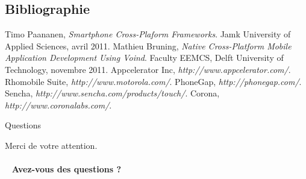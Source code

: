 \documentclass{beamer}
\begin{document}
\subsection{Bibliographie}
\begin{frame}
\begin{thebibliography}{9}
          Timo Paananen,
          \emph{Smartphone Cross-Plaform Frameworks}.
          Jamk University of Applied Sciences,
          avril 2011.
          Mathieu Bruning,
          \emph{Native Cross-Platform Mobile Application Development Using Voind}.
          Faculty EEMCS, Delft University of Technology,
          novembre 2011.
          Appcelerator Inc,
          \emph{http://www.appcelerator.com/}.
          Rhomobile Suite,
          \emph{http://www.motorola.com/}.
          PhoneGap,
          \emph{http://phonegap.com/}.
          Sencha,
          \emph{http://www.sencha.com/products/touch/}.
          Corona,
          \emph{http://www.coronalabs.com/}.
\end{thebibliography}
\end{frame}

\begin{frame}{Questions}
\begin{center}
  Merci de votre attention.
  \\ ~ \\ ~
  \textbf{Avez-vous des questions ?}
\end{center}
\end{frame}
\end{document}
